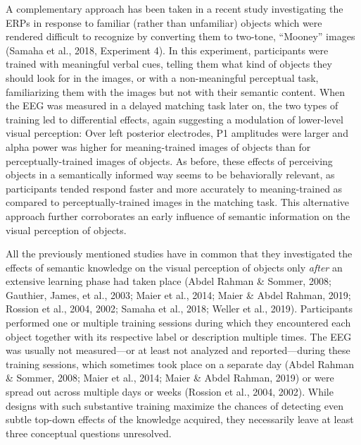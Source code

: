 \documentclass[
  english,
  doc,12pt,twoside,floatsintext]{apa7}
\begin{document}
A complementary approach has been taken in a recent study investigating the ERPs in response to familiar (rather than unfamiliar) objects which were rendered difficult to recognize by converting them to two-tone, ``Mooney'' images (Samaha et al., 2018, Experiment 4). In this experiment, participants were trained with meaningful verbal cues, telling them what kind of objects they should look for in the images, or with a non-meaningful perceptual task, familiarizing them with the images but not with their semantic content. When the EEG was measured in a delayed matching task later on, the two types of training led to differential effects, again suggesting a modulation of lower-level visual perception: Over left posterior electrodes, P1 amplitudes were larger and alpha power was higher for meaning-trained images of objects than for perceptually-trained images of objects. As before, these effects of perceiving objects in a semantically informed way seems to be behaviorally relevant, as participants tended respond faster and more accurately to meaning-trained as compared to perceptually-trained images in the matching task. This alternative approach further corroborates an early influence of semantic information on the visual perception of objects.

All the previously mentioned studies have in common that they investigated the effects of semantic knowledge on the visual perception of objects only \emph{after} an extensive learning phase had taken place (Abdel Rahman \& Sommer, 2008; Gauthier, James, et al., 2003; Maier et al., 2014; Maier \& Abdel Rahman, 2019; Rossion et al., 2004, 2002; Samaha et al., 2018; Weller et al., 2019). Participants performed one or multiple training sessions during which they encountered each object together with its respective label or description multiple times. The EEG was usually not measured---or at least not analyzed and reported---during these training sessions, which sometimes took place on a separate day (Abdel Rahman \& Sommer, 2008; Maier et al., 2014; Maier \& Abdel Rahman, 2019) or were spread out across multiple days or weeks (Rossion et al., 2004, 2002). While designs with such substantive training maximize the chances of detecting even subtle top-down effects of the knowledge acquired, they necessarily leave at least three conceptual questions unresolved.
\end{document}
